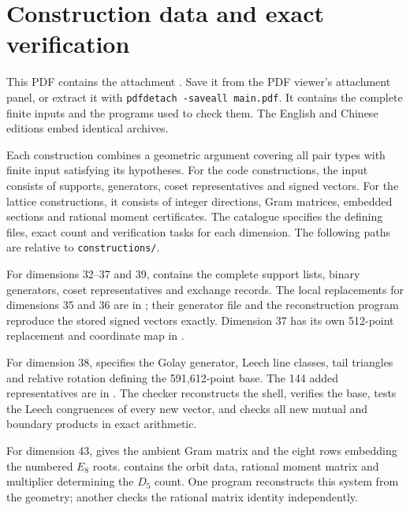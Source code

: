 \section{Construction data and exact verification}\label{app:data}

This PDF contains the attachment
.
Save it from the PDF viewer's attachment panel, or extract it with
\texttt{pdfdetach -saveall main.pdf}. It contains the complete finite
inputs and the programs used to check them. The English and Chinese
editions embed identical archives.

Each construction combines a geometric argument covering all pair types
with finite input satisfying its hypotheses. For the code constructions,
the input consists of supports, generators, coset representatives and
signed vectors. For the lattice constructions, it consists of integer
directions, Gram matrices, embedded sections and rational moment
certificates. The catalogue 
specifies the defining files, exact count and verification tasks for each
dimension. The following paths are relative to \texttt{constructions/}.

For dimensions 32--37 and 39,  contains the complete
support lists, binary generators, coset representatives and exchange
records. The local replacements for dimensions 35 and 36 are in
; their generator file and the reconstruction
program reproduce the stored signed vectors exactly. Dimension 37 has
its own 512-point replacement and coordinate map in .

For dimension 38,  specifies the Golay generator,
Leech line classes, tail triangles and relative rotation defining the
591,612-point base. The 144 added representatives are in
. The checker reconstructs the shell, verifies
the base, tests the Leech congruences of every new vector, and checks all
new mutual and boundary products in exact arithmetic.

For dimension 43,  gives the
ambient Gram matrix and the eight rows embedding the numbered $E_8$ roots.
 contains the orbit data,
rational moment matrix and multiplier determining the $D_5$ count.
One program reconstructs this system from the geometry; another checks
the rational matrix identity independently.

